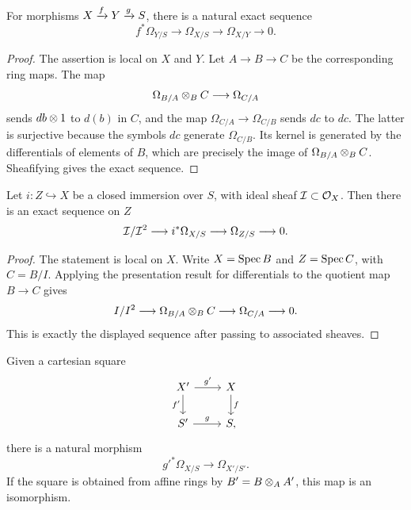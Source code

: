 \begin{proposition}
For morphisms \(X\xrightarrow{f}Y\xrightarrow{g}S\), there is a natural exact sequence
\[
    f^*\Omega_{Y/S}\longrightarrow \Omega_{X/S}
    \longrightarrow \Omega_{X/Y}\longrightarrow 0.
\]
\end{proposition}

\begin{proof}
The assertion is local on \(X\) and \(Y\).  Let \(A\to B\to C\) be the
corresponding ring maps.  The map
\[
    \Omega_{B/A}\otimes_B C\longrightarrow\Omega_{C/A}
\]
sends \(db\otimes 1\) to \(d(b)\) in \(C\), and the map
\(\Omega_{C/A}\to\Omega_{C/B}\) sends \(dc\) to \(dc\).  The latter is
surjective because the symbols \(dc\) generate \(\Omega_{C/B}\).  Its kernel is
generated by the differentials of elements of \(B\), which are precisely the
image of \(\Omega_{B/A}\otimes_B C\).  Sheafifying gives the exact sequence.
\end{proof}

\begin{proposition}
Let \(i:Z\hookrightarrow X\) be a closed immersion over \(S\), with ideal sheaf
\(\mathcal{I}\subset\mathcal{O}_X\).  Then there is an exact sequence on \(Z\)
\[
    \mathcal{I}/\mathcal{I}^2\longrightarrow i^*\Omega_{X/S}
    \longrightarrow \Omega_{Z/S}\longrightarrow 0.
\]
\end{proposition}

\begin{proof}
The statement is local on \(X\).  Write \(X=\operatorname{Spec} B\) and
\(Z=\operatorname{Spec} C\), with \(C=B/I\).  Applying the presentation result for
differentials to the quotient map \(B\to C\) gives
\[
    I/I^2\longrightarrow \Omega_{B/A}\otimes_B C
    \longrightarrow \Omega_{C/A}\longrightarrow0.
\]
This is exactly the displayed sequence after passing to associated sheaves.
\end{proof}

\begin{proposition}
Given a cartesian square
\[
\begin{tikzcd}
X' \arrow[r,"g'"] \arrow[d,"f'"'] & X \arrow[d,"f"]\\
S' \arrow[r,"g"] & S ,
\end{tikzcd}
\]
there is a natural morphism
\[
    g'^*\Omega_{X/S}\longrightarrow \Omega_{X'/S'}.
\]
If the square is obtained from affine rings by \(B'=B\otimes_A A'\), this map
is an isomorphism.
\end{proposition}

